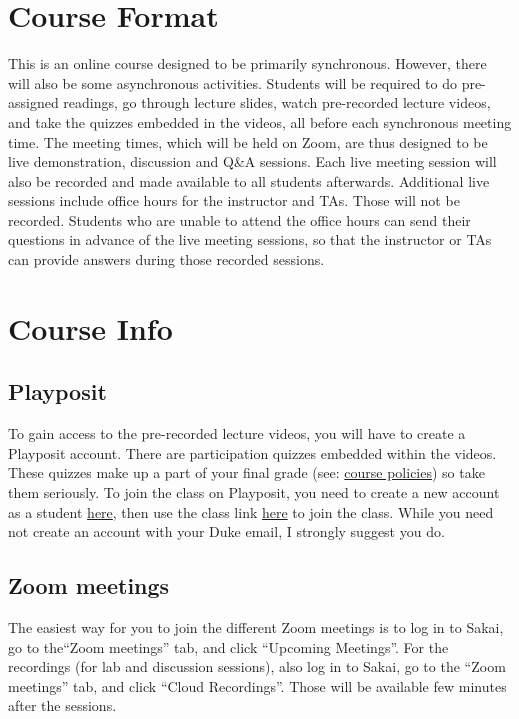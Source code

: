 \documentclass[11pt, a4paper]{article}
\begin{document}
\section{Course Format}
This is an online course designed to be primarily synchronous. However, there will also be some asynchronous activities. Students will be required to do pre-assigned readings, go through lecture slides, watch pre-recorded lecture videos, and take the quizzes embedded in the videos, all before each synchronous meeting time. The meeting times, which will be held on Zoom, are thus designed to be live demonstration, discussion and Q\&A sessions. Each live meeting session will also be recorded and made available to all students afterwards. Additional live sessions include office hours for the instructor and TAs. Those will not be recorded. Students who are unable to attend the office hours can send their questions in advance of the live meeting sessions, so that the instructor or TAs can provide answers during those recorded sessions.

\section{Course Info}
\subsection{Playposit}
To gain access to the pre-recorded lecture videos, you will have to create a Playposit account. There are participation quizzes embedded within the videos. These quizzes make up a part of your final grade (see: \href{https://ids-702-f20.github.io/Course-Website/policies/}{course policies}) so take them seriously. To join the class on Playposit, you need to create a new account as a student \href{https://www.playposit.com/join}{here}, then use the class link \href{https://www.playposit.com/join-class/1403540-929415}{here} to join the class. While you need not create an account with your Duke email, I strongly suggest you do.

\subsection{Zoom meetings}
The easiest way for you to join the different Zoom meetings is to log in to Sakai, go to the``Zoom meetings'' tab, and click ``Upcoming Meetings''. For the recordings (for lab and discussion sessions), also log in to Sakai, go to the ``Zoom meetings'' tab, and click ``Cloud Recordings''. Those will be available few minutes after the sessions.
\end{document}
